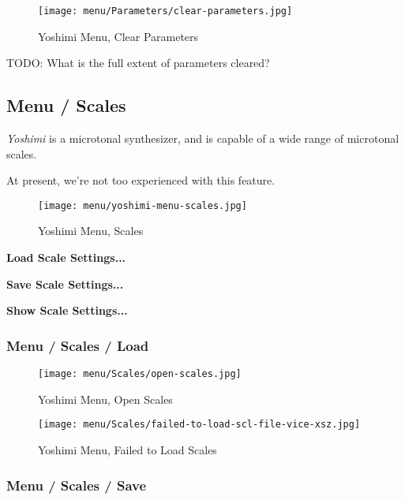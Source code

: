 \begin{figure}[H]
   \centering 
   \texttt{[image: menu/Parameters/clear-parameters.jpg]}
   \caption{Yoshimi Menu, Clear Parameters}
   \label{fig:yoshimi_menu_clear_parameters}
\end{figure}

   TODO:  What is the full extent of parameters cleared?

\subsection{Menu / Scales}
\label{subsec:menu_scales}

   \textsl{Yoshimi} is a microtonal synthesizer, and is capable of a wide
   range of microtonal scales.

   At present, we're not too experienced with this feature.

\begin{figure}[H]
   \centering 
   \texttt{[image: menu/yoshimi-menu-scales.jpg]}
   \caption{Yoshimi Menu, Scales}
   \label{fig:yoshimi_menu_scales}
\end{figure}

   \begin{enumber}
      \item \textbf{Load Scale Settings...}
      \item \textbf{Save Scale Settings...}
      \item \textbf{Show Scale Settings...}
   \end{enumber}

\subsubsection{Menu / Scales / Load}
\label{subsec:menu_scales_load}

\begin{figure}[H]
   \centering 
   \texttt{[image: menu/Scales/open-scales.jpg]}
   \caption{Yoshimi Menu, Open Scales}
   \label{fig:yoshimi_menu_open_scales}
\end{figure}

\begin{figure}[H]
   \centering 
   \texttt{[image: menu/Scales/failed-to-load-scl-file-vice-xsz.jpg]}
   \caption{Yoshimi Menu, Failed to Load Scales}
   \label{fig:yoshimi_menu_failed_to_load_scales}
\end{figure}

\subsubsection{Menu / Scales / Save}
\label{subsec:menu_scales_save}

